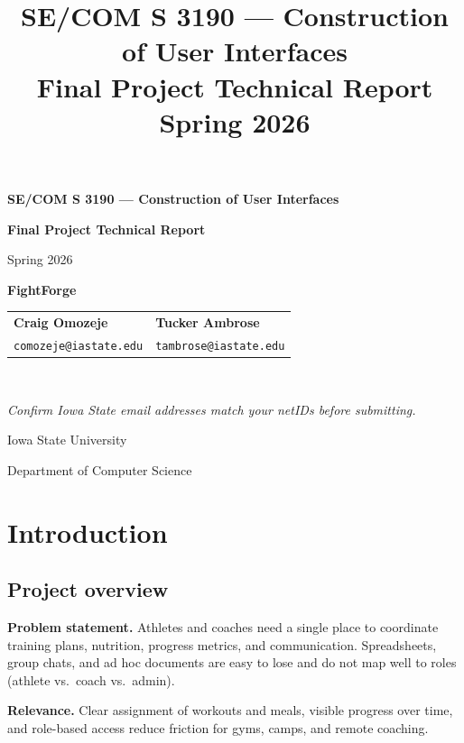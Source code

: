 \documentclass[11pt,letterpaper]{article}
\title{\vspace{-2em}\Large\textbf{SE/COM S 3190} --- Construction of User Interfaces\\[0.8em]
\LARGE Final Project Technical Report\\[0.3em]
\large Spring 2026}
\author{}
\date{}
\begin{document}
\begin{titlepage}
  \centering
  \vspace*{1.5cm}
  {\Large\bfseries SE/COM S 3190 --- Construction of User Interfaces\par}
  \vspace{0.6cm}
  {\LARGE\bfseries Final Project Technical Report\par}
  \vspace{0.4cm}
  {\large Spring 2026\par}
  \vspace{2cm}
  {\Huge\bfseries FightForge\par}
  \vspace{1.5cm}
  \begin{tabular}{p{2.8in}p{2.8in}}
    \textbf{Craig Omozeje} & \textbf{Tucker Ambrose} \\
    \texttt{comozeje@iastate.edu} & \texttt{tambrose@iastate.edu} \\
  \end{tabular}\\[0.8em]
  {\small\textit{Confirm Iowa State email addresses match your netIDs before submitting.}\par}
  \vfill
  {\large Iowa State University\par}
  {\large Department of Computer Science\par}
  \vspace{1.5cm}
\end{titlepage}

\tableofcontents
\newpage

\section{Introduction}

\subsection{Project overview}
\textbf{Problem statement.} Athletes and coaches need a single place to coordinate training plans, nutrition, progress metrics, and communication. Spreadsheets, group chats, and ad hoc documents are easy to lose and do not map well to roles (athlete vs.\ coach vs.\ admin).

\textbf{Relevance.} Clear assignment of workouts and meals, visible progress over time, and role-based access reduce friction for gyms, camps, and remote coaching.
\end{document}
